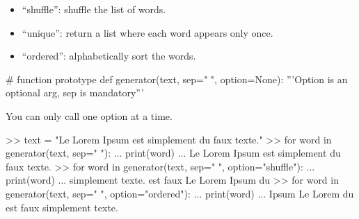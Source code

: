 \documentclass[]{article}
\newenvironment{Shaded}{\begin{snugshade}}{\end{snugshade}}
\newcommand{\BuiltInTok}[1]{\textcolor[rgb]{0.50,0.55,0.55}{#1}}
\newcommand{\CommentTok}[1]{\textcolor[rgb]{0.48,0.49,0.49}{#1}}
\newcommand{\ControlFlowTok}[1]{\textcolor[rgb]{0.99,0.74,0.29}{#1}}
\newcommand{\KeywordTok}[1]{\textcolor[rgb]{0.81,0.81,0.76}{#1}}
\newcommand{\NormalTok}[1]{\textcolor[rgb]{0.81,0.81,0.76}{#1}}
\newcommand{\OperatorTok}[1]{\textcolor[rgb]{0.81,0.81,0.76}{#1}}
\newcommand{\StringTok}[1]{\textcolor[rgb]{0.96,0.31,0.31}{#1}}
\newcommand{\VariableTok}[1]{\textcolor[rgb]{0.15,0.68,0.68}{#1}}
\begin{document}
\begin{itemize}
\item
  ``shuffle'': shuffle the list of words.
\item
  ``unique'': return a list where each word appears only once.
\item
  ``ordered'': alphabetically sort the words.
\end{itemize}

\begin{Shaded}
\begin{Highlighting}[]
\CommentTok{# function prototype}
\KeywordTok{def}\NormalTok{ generator(text, sep}\OperatorTok{=}\StringTok{" "}\NormalTok{, option}\OperatorTok{=}\VariableTok{None}\NormalTok{):}
    \CommentTok{'''Option is an optional arg, sep is mandatory'''}
\end{Highlighting}
\end{Shaded}

You can only call one option at a time.

\begin{Shaded}
\begin{Highlighting}[]
\OperatorTok{>>}\NormalTok{ text }\OperatorTok{=} \StringTok{"Le Lorem Ipsum est simplement du faux texte."}
\OperatorTok{>>} \ControlFlowTok{for}\NormalTok{ word }\KeywordTok{in}\NormalTok{ generator(text, sep}\OperatorTok{=}\StringTok{" "}\NormalTok{):}
\NormalTok{...     }\BuiltInTok{print}\NormalTok{(word)}
\NormalTok{...}
\NormalTok{Le}
\NormalTok{Lorem}
\NormalTok{Ipsum}
\NormalTok{est}
\NormalTok{simplement}
\NormalTok{du}
\NormalTok{faux}
\NormalTok{texte.}
\OperatorTok{>>} \ControlFlowTok{for}\NormalTok{ word }\KeywordTok{in}\NormalTok{ generator(text, sep}\OperatorTok{=}\StringTok{" "}\NormalTok{, option}\OperatorTok{=}\StringTok{"shuffle"}\NormalTok{):}
\NormalTok{...     }\BuiltInTok{print}\NormalTok{(word)}
\NormalTok{...}
\NormalTok{simplement}
\NormalTok{texte.}
\NormalTok{est}
\NormalTok{faux}
\NormalTok{Le}
\NormalTok{Lorem}
\NormalTok{Ipsum}
\NormalTok{du}
\OperatorTok{>>} \ControlFlowTok{for}\NormalTok{ word }\KeywordTok{in}\NormalTok{ generator(text, sep}\OperatorTok{=}\StringTok{" "}\NormalTok{, option}\OperatorTok{=}\StringTok{"ordered"}\NormalTok{):}
\NormalTok{...     }\BuiltInTok{print}\NormalTok{(word)}
\NormalTok{...}
\NormalTok{Ipsum}
\NormalTok{Le}
\NormalTok{Lorem}
\NormalTok{du}
\NormalTok{est}
\NormalTok{faux}
\NormalTok{simplement}
\NormalTok{texte.}
\end{Highlighting}
\end{Shaded}
\end{document}
